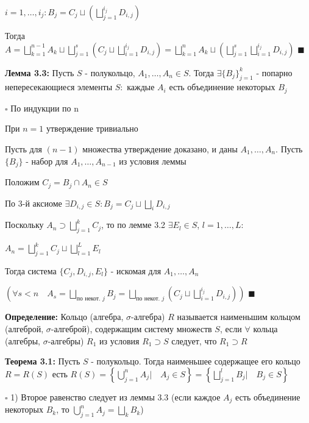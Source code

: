 \documentclass[a4paper]{report}
\begin{document}
 $i=1,\ldots,i_j\colon B_j=C_j\sqcup\left(\bigsqcup\limits_{j=1}^{i_j}
D_{i,j}\right)$

Тогда $A=\bigsqcup\limits_{k=1}^{n-1}A_k\sqcup\bigsqcup\limits_{j=1}^s\left(C_j\sqcup\bigsqcup\limits_{i=1}^{i_j} D_{i,j}\right)=
\bigsqcup\limits_{k=1}^n A_k\sqcup\left(\bigsqcup\limits_{j=1}^s\bigsqcup\limits_{i=1}^{i_j}D_{i,j}\right)$ $\blacksquare$
\bigskip

\noindent\textbf{Лемма 3.3:} Пусть $S$ - полукольцо, $A_1,\ldots,A_n\in S$. Тогда $\exists\{B_j\}_{j=1}^k$ - попарно
непересекающиеся элементы $S\colon$ каждые $A_i$ есть объединение некоторых $B_j$

\noindent $\square$ По индукции по n

При $n=1$ утверждение тривиально

Пусть для $(n-1)$ множества утверждение доказано, и даны $A_1,\ldots,A_n$. Пусть $\{B_j\}$ - набор для $A_1,\ldots,A_{n-1}$
из условия леммы

Положим $C_j=B_j\cap A_n\in S$

По 3-й аксиоме $\exists D_{i,j}\in S\colon B_j=C_j\sqcup\bigsqcup\limits_i D_{i,j}$

Поскольку $A_n\supset\bigsqcup\limits_{j=1}^k C_j$, то по лемме 3.2 $\exists E_l\in S$, $l=1,\ldots,L\colon $

$A_n=\bigsqcup
\limits_{j=1}^k C_j\sqcup\bigsqcup\limits_{l=1}^L E_l$

Тогда система $\{C_j,D_{i,j},E_l\}$ - искомая для $A_1,\ldots,A_n$

$\left(\forall s<n\quad A_s=\bigsqcup\limits_{\text{по некот. }j}B_j=\bigsqcup\limits_{\text{по некот. }j}(C_j\sqcup
\bigsqcup\limits_{i=1}^{i_j}D_{i,j})\right)$ $\blacksquare$
\bigskip

\noindent\textbf{Определение:} Кольцо (алгебра, $\sigma$-алгебра) $R$ называется наименьшим кольцом (алгеброй, $\sigma$-алгеброй),
содержащим систему множеств $S$, если $\forall$ кольца (алгебры, $\sigma$-алгебры) $R_1$ из условия $R_1\supset S$
следует, что $R_1\supset R$
\bigskip

\noindent\textbf{Теорема 3.1:} Пусть $S$ - полукольцо. Тогда наименьшее содержащее его кольцо $R=R(S)$ есть $R(S)=\left\{
\bigcup\limits_{j=1}^n A_j|\quad A_j\in S\right\}=\left\{\bigsqcup\limits_{j=1}^l B_j|\quad B_j\in S\right\}$

\noindent $\square$ 1) Второе равенство следует из леммы 3.3 (если каждое $A_j$ есть объединение некоторых $B_k$, то
$\bigcup\limits_{j=1}^n A_j=\bigsqcup\limits_k B_k$)
\end{document}
